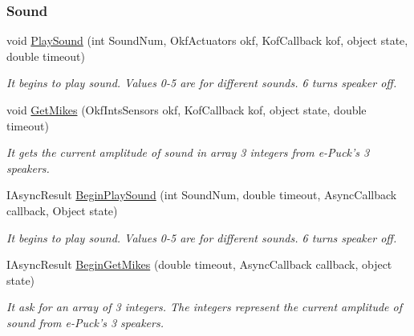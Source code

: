 \subsubsection*{Sound} %
\label{ssub:Sound}
  \begin{DoxyCompactItemize}

  \item void \hyperlink{class_elib_1_1_epuck_a74acd305895e4f07920c45f8b29a8157}{PlaySound} (int SoundNum, OkfActuators okf, KofCallback kof, object state, double timeout)
  \begin{DoxyCompactList}\small\item\em It begins to play sound. Values 0-\/5 are for different sounds. 6 turns speaker off. \item\end{DoxyCompactList}

  \item void \hyperlink{class_elib_1_1_epuck_a176a4a63393394a409220699635a9196}{GetMikes} (OkfIntsSensors okf, KofCallback kof, object state, double timeout)
  \begin{DoxyCompactList}\small\item\em It gets the current amplitude of sound in array 3 integers from e-\/Puck's 3 speakers. \item\end{DoxyCompactList}

  \item   IAsyncResult \hyperlink{class_elib_1_1_epuck_a2426a9ea921c131b8349204f477121f5}{BeginPlaySound} (int SoundNum, double timeout, AsyncCallback callback, Object state)
  \begin{DoxyCompactList}\small\item\em It begins to play sound. Values 0-\/5 are for different sounds. 6 turns speaker off. \item\end{DoxyCompactList}

  \item  IAsyncResult \hyperlink{class_elib_1_1_epuck_af69a96d43cc6d5c47960061312d1937b}{BeginGetMikes} (double timeout, AsyncCallback callback, object state)
  \begin{DoxyCompactList}\small\item\em It ask for an array of 3 integers. The integers represent the current amplitude of sound from e-\/Puck's 3 speakers. \item\end{DoxyCompactList}

  \end{DoxyCompactItemize}

